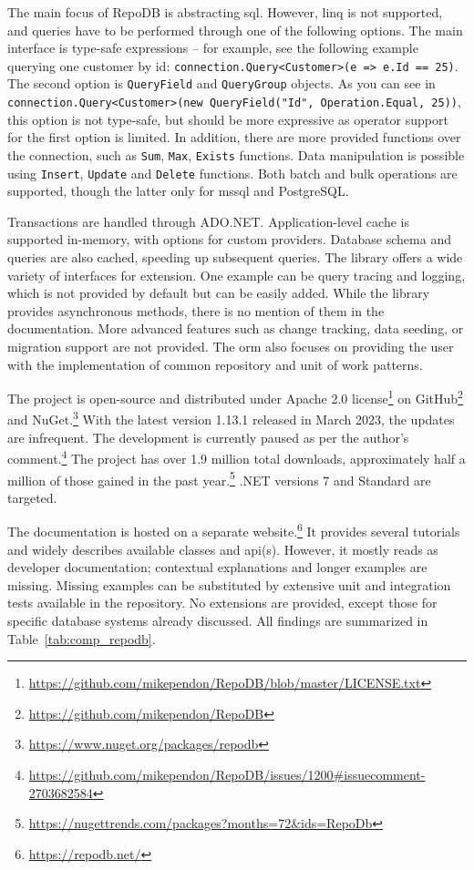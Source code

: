 The main focus of RepoDB is abstracting \acrshort{sql}. However, \acrshort{linq} is not supported, and queries have to be performed through one of the following options. The main interface is type-safe expressions -- for example, see the following example querying one customer by id: \lstinline{connection.Query<Customer>(e => e.Id == 25)}. The second option is \texttt{QueryField} and \texttt{QueryGroup} objects. As you can see in \lstinline{connection.Query<Customer>(new QueryField("Id", Operation.Equal, 25))}, this option is not type-safe, but should be more expressive as operator support for the first option is limited. In addition, there are more provided functions over the connection, such as \texttt{Sum}, \texttt{Max}, \texttt{Exists} functions. Data manipulation is possible using \texttt{Insert}, \texttt{Update} and \texttt{Delete} functions. Both batch and bulk operations are supported, though the latter only for \acrshort{mssql} and PostgreSQL.

Transactions are handled through ADO.NET. Application-level cache is supported in-memory, with options for custom providers. Database schema and queries are also cached, speeding up subsequent queries. The library offers a wide variety of interfaces for extension. One example can be query tracing and logging, which is not provided by default but can be easily added. While the library provides asynchronous methods, there is no mention of them in the documentation. More advanced features such as change tracking, data seeding, or migration support are not provided. The \acrshort{orm} also focuses on providing the user with the implementation of common repository and unit of work patterns.

The project is open-source and distributed under Apache 2.0 license\footnote{\url{https://github.com/mikependon/RepoDB/blob/master/LICENSE.txt}} on GitHub\footnote{\url{https://github.com/mikependon/RepoDB}} and NuGet.\footnote{\url{https://www.nuget.org/packages/repodb}} With the latest version 1.13.1 released in March 2023, the updates are infrequent. The development is currently paused as per the author's comment.\footnote{\url{https://github.com/mikependon/RepoDB/issues/1200\#issuecomment-2703682584}} The project has over 1.9 million total downloads, approximately half a million of those gained in the past year.\footnote{\url{https://nugettrends.com/packages?months=72&ids=RepoDb}} .NET versions 7 and Standard are targeted. 

The documentation is hosted on a separate website.\footnote{\url{https://repodb.net/}} It provides several tutorials and widely describes available classes and \acrshort{api}(s). However, it mostly reads as developer documentation; contextual explanations and longer examples are missing. Missing examples can be substituted by extensive unit and integration tests available in the repository. No extensions are provided, except those for specific database systems already discussed. All findings are summarized in Table~\ref{tab:comp_repodb}.


